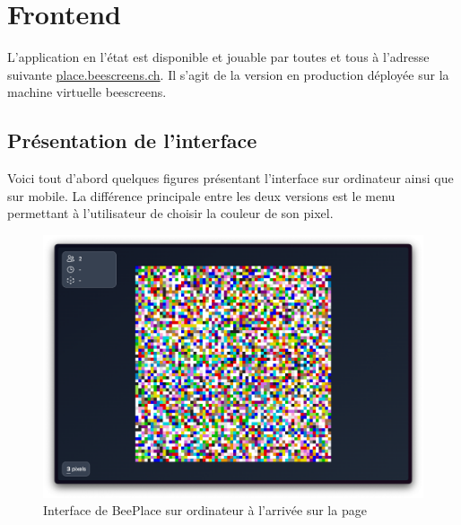 \section{Frontend}

L'application en l'état est disponible et jouable par toutes et tous à l'adresse suivante \href{https://place.beescreens.ch}{place.beescreens.ch}. Il s'agit de la version en production déployée sur la machine virtuelle \gls{beescreens}.

\subsection{Présentation de l'interface}

Voici tout d'abord quelques figures présentant l'interface sur ordinateur ainsi que sur mobile. La différence principale entre les deux versions est le menu permettant à l'utilisateur de choisir la couleur de son pixel.


\begin{figure}[H]
  \centering
  \includegraphics[width=1\textwidth]{./assets/figures/screenshot-app-v2-1.png}
  \caption{Interface de BeePlace sur ordinateur à l'arrivée sur la page}
  \label{fig:screenshot-app-1}
\end{figure}

